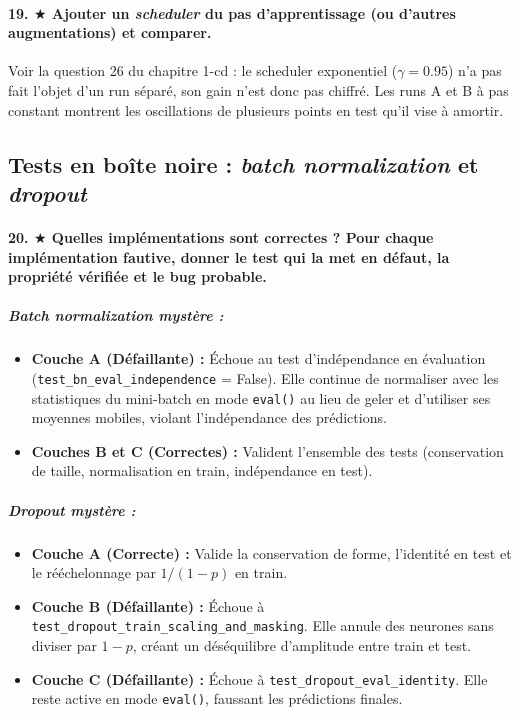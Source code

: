 \documentclass{report}
\begin{document}
\paragraph{19. $\bigstar$ Ajouter un \textit{scheduler} du pas d'apprentissage (ou d'autres augmentations) et comparer.}
Voir la question 26 du chapitre 1-cd : le scheduler exponentiel ($\gamma = 0.95$) n'a pas fait l'objet d'un run séparé, son gain n'est donc pas chiffré. Les runs A et B à pas constant montrent les oscillations de plusieurs points en test qu'il vise à amortir.

\subsection{Tests en boîte noire : \textit{batch normalization} et \textit{dropout}}
\paragraph{20. $\bigstar$ Quelles implémentations sont correctes ? Pour chaque implémentation fautive, donner le test qui la met en défaut, la propriété vérifiée et le bug probable.}

\subparagraph{\textit{Batch normalization} mystère :}
\begin{itemize}
    \item \textbf{Couche A (Défaillante) :} Échoue au test d'indépendance en évaluation (\texttt{test\_bn\_eval\_independence} = False). Elle continue de normaliser avec les statistiques du mini-batch en mode \texttt{eval()} au lieu de geler et d'utiliser ses moyennes mobiles, violant l'indépendance des prédictions.
    \item \textbf{Couches B et C (Correctes) :} Valident l'ensemble des tests (conservation de taille, normalisation en train, indépendance en test).
\end{itemize}

\subparagraph{\textit{Dropout} mystère :}
\begin{itemize}
    \item \textbf{Couche A (Correcte) :} Valide la conservation de forme, l'identité en test et le rééchelonnage par $1/(1-p)$ en train.
    \item \textbf{Couche B (Défaillante) :} Échoue à \texttt{test\_dropout\_train\_scaling\_and\_masking}. Elle annule des neurones sans diviser par $1-p$, créant un déséquilibre d'amplitude entre train et test.
    \item \textbf{Couche C (Défaillante) :} Échoue à \texttt{test\_dropout\_eval\_identity}. Elle reste active en mode \texttt{eval()}, faussant les prédictions finales.
\end{itemize}
\end{document}
